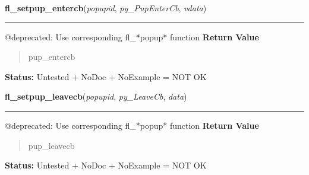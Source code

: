 \hspace{.8\funcindent}\begin{boxedminipage}{\funcwidth}

    \raggedright \textbf{fl\_setpup\_entercb}(\textit{popupid}, \textit{py\_PupEnterCb}, \textit{vdata})

    \vspace{-1.5ex}

    \rule{\textwidth}{0.5\fboxrule}
\setlength{\parskip}{2ex}

@deprecated: Use corresponding fl\_*popup* function
\setlength{\parskip}{1ex}
      \textbf{Return Value}
    \vspace{-1ex}

      \begin{quote}

pup\_entercb
      \end{quote}

\textbf{Status:} 
Untested + NoDoc + NoExample = NOT OK


    \end{boxedminipage}

    \label{xformslib:deprecated:fl_setpup_leavecb}

    \vspace{0.5ex}

\hspace{.8\funcindent}\begin{boxedminipage}{\funcwidth}

    \raggedright \textbf{fl\_setpup\_leavecb}(\textit{popupid}, \textit{py\_LeaveCb}, \textit{data})

    \vspace{-1.5ex}

    \rule{\textwidth}{0.5\fboxrule}
\setlength{\parskip}{2ex}

@deprecated: Use corresponding fl\_*popup* function
\setlength{\parskip}{1ex}
      \textbf{Return Value}
    \vspace{-1ex}

      \begin{quote}

pup\_leavecb
      \end{quote}

\textbf{Status:} 
Untested + NoDoc + NoExample = NOT OK


    \end{boxedminipage}

